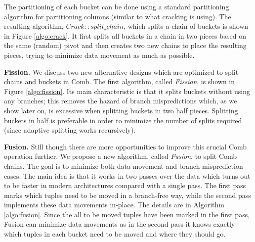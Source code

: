The partitioning of each bucket can be done using a standard partitioning algorithm
for partitioning columns (similar to what cracking is using). 
The resulting algorithm, $Crack::split\_chain$, which splits a chain of buckets is shown in Figure \ref{algo:crack}.
It first splits all buckets in a chain in two pieces based on the same (random) pivot and then creates two new chains 
to place the resulting pieces, trying to minimize data movement as much as possible.


\textbf{Fission.}
We discuss two new alternative designs which are optimized to split chains and buckets in Comb.
The first algorithm, called \emph{Fission}, is shown in 
Figure \ref{algo:fission}. Its main characteristic is that it splits buckets without using any branches;
this removes the hazard of branch mispredictions which, as we show later on, 
is excessive when splitting buckets in two half pieces.
Splitting buckets in half is preferable in order to minimize the number of splits required
(since adaptive splitting works recursively).

\textbf{Fusion.}
Still though there are more opportunities to improve this crucial Comb operation further.
We propose a new algorithm, called \emph{Fusion}, to split Comb chains.
The goal is to minimize both data movement and branch misprediction cases.
The main idea is that it works in two passes over the data which turns
out to be faster in modern architectures compared with a single pass.
The first pass marks which tuples need to be moved in a branch-free way, 
while the second pass implements these data movements in-place. 
The details are in Algorithm \ref{algo:fusion}.
Since the all to be moved tuples have been marked in the first pass, Fusion can minimize data movements
as in the second pass it knows exactly which tuples in each bucket need to be moved and where they should go.
 








